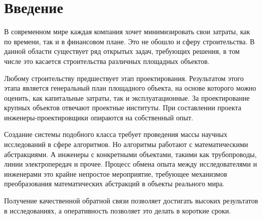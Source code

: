 \section*{\Large{Введение}}
В современном мире каждая компания хочет минимизировать свои затраты, как по времени, так и в финансовом плане.
Это не обошло и сферу строительства.
В данной области существует ряд открытых задач, требующих решения,
в том числе это касается строительства различных площадных объектов.

Любому строительству предшествует этап проектирования.
Результатом этого этапа является генеральный план площадного объекта,
на основе которого можно оценить, как капитальные затраты, так и эксплуатационные.
За проектирование крупных объектов отвечают проектные институты.
При составлении проекта инженеры-проектировщики опираются на собственный опыт.

Создание системы подобного класса требует проведения массы научных исследований в сфере алгоритмов.
Но алгоритмы работают с математическими абстракциями.
А инженеры с конкретными объектами, такими как трубопроводы, линии электропередач и прочее.
Процесс обмена опыта между исследователями и инженерами это крайне непростое мероприятие,
требующее механизмов преобразования математических абстракций в объекты реального мира.

Получение качественной обратной связи позволяет достигать высоких результатов в исследованиях, а оперативность
позволяет это делать в короткие сроки.

